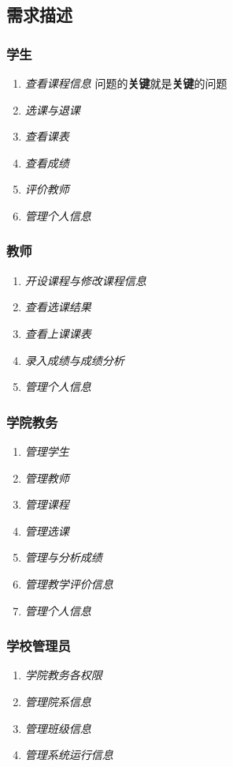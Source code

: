 \subsection{需求描述}

\subsubsection{学生}
\begin{enumerate}
    \item \textit{查看课程信息} \quad 问题的\textbf{关键}就是\textbf{关键}的问题
    \item \textit{选课与退课} \quad 
    \item \textit{查看课表} \quad 
    \item \textit{查看成绩} \quad 
    \item \textit{评价教师} \quad 
    \item \textit{管理个人信息} \quad 
\end{enumerate}

\subsubsection{教师}
\begin{enumerate}
    \item \textit{开设课程与修改课程信息} \quad 
    \item \textit{查看选课结果} \quad 
    \item \textit{查看上课课表} \quad 
    \item \textit{录入成绩与成绩分析} \quad 
    \item \textit{管理个人信息} \quad 
\end{enumerate}

\subsubsection{学院教务}
\begin{enumerate}
    \item \textit{管理学生} \quad 
    \item \textit{管理教师} \quad 
    \item \textit{管理课程} \quad 
    \item \textit{管理选课} \quad 
    \item \textit{管理与分析成绩} \quad 
    \item \textit{管理教学评价信息} \quad 
    \item \textit{管理个人信息} \quad 
\end{enumerate}

\subsubsection{学校管理员}
\begin{enumerate}
    \item \textit{学院教务各权限} \quad 
    \item \textit{管理院系信息} \quad 
    \item \textit{管理班级信息} \quad 
    \item \textit{管理系统运行信息} \quad 
\end{enumerate}
